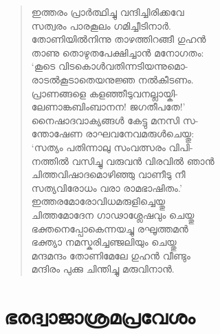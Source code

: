 \begin{verse}
ഇത്തരം പ്രാര്‍ത്ഥിച്ചു വന്ദിച്ചിരിക്കവേ\\
സത്വരം പാരകൂലം ഗമിച്ചീടിനാര്‍.\\
തോണിയില്‍നിന്നു താഴത്തിറങ്ങീ ഗുഹന്‍\\
താണു തൊഴുതപേക്ഷിച്ചാന്‍ മനോഗതം:\\
‘കൂടെ വിടകൊള്‍വതിന്നടിയന്നുമൊ-\\
രാടല്‍കൂടാതെയനുജ്ഞ നല്‍കീടണം.\\
പ്രാണങ്ങളെ കളഞ്ഞീടുവനല്ലായ്കി-\\
ലേണാങ്കബിംബാനന! ജഗതീപതേ!’\\
നൈഷാദവാക്യങ്ങള്‍ കേട്ടു മനസി സ-\\
ന്തോഷേണ രാഘവനേവമരുള്‍ചെയ്തു:\\
‘സത്യം പതിന്നാലു സംവത്സരം വിപി-\\
നത്തില്‍ വസിച്ചു വരുവന്‍ വിരവില്‍ ഞാന്‍\\
ചിത്തവിഷാദമൊഴിഞ്ഞു വാണീടു നീ\\
സത്യവിരോധം വരാ രാമഭാഷിതം.’\\
ഇത്തരമോരോവിധമരുളിച്ചെയ്തു\\
ചിത്തമോദേന ഗാഢാശ്ലേഷവും ചെയ്തു\\
ഭക്തനെപ്പോകെന്നയച്ചു രഘൂത്തമന്‍\\
ഭക്ത്യാ നമസ്കരിച്ചഞ്ജലിയും ചെയ്തു\\
മന്ദമന്ദം തോണിമേലേ ഗുഹന്‍ വീണ്ടും\\
മന്ദിരം പുക്കു ചിന്തിച്ചു മരുവിനാന്‍.
\end{verse}


\section{ഭരദ്വാജാശ്രമപ്രവേശം}

